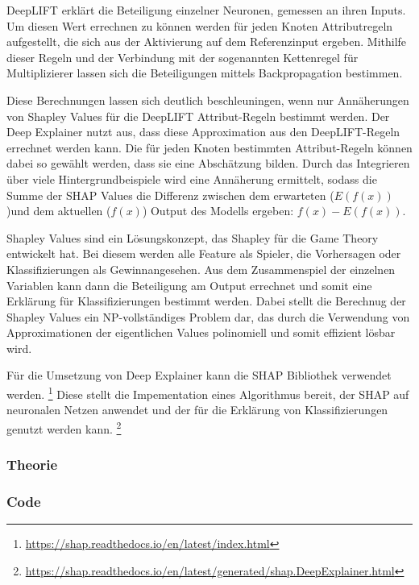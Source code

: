 DeepLIFT erklärt die Beteiligung einzelner Neuronen, gemessen an ihren Inputs. Um diesen Wert errechnen zu können werden für jeden Knoten Attributregeln aufgestellt, die sich aus der Aktivierung auf dem Referenzinput ergeben. Mithilfe dieser Regeln und der Verbindung mit der sogenannten Kettenregel für Multiplizierer \cite{ShrikumarSHAPDeepExplainer} lassen sich die Beteiligungen mittels Backpropagation bestimmen. \cite{ShrikumarSHAPDeepExplainer}


Diese Berechnungen lassen sich deutlich beschleuningen, wenn nur Annäherungen von Shapley Values für die DeepLIFT Attribut-Regeln bestimmt werden. Der Deep Explainer nutzt aus, dass diese Approximation aus den DeepLIFT-Regeln errechnet werden kann. Die für jeden Knoten bestimmten Attribut-Regeln können dabei so gewählt werden, dass sie eine Abschätzung bilden. Durch das Integrieren über viele Hintergrundbeispiele wird eine Annäherung ermittelt, sodass die Summe der SHAP Values die Differenz zwischen dem erwarteten ($E(f(x))$)und dem aktuellen ($f(x)$) Output des Modells ergeben: $f(x)-E(f(x))$. \cite{LundbergSHAPDeepExplainer} 


Shapley Values sind ein Lösungskonzept, das Shapley für die Game Theory entwickelt hat. Bei diesem werden alle Feature als \glqq Spieler\grqq, die Vorhersagen oder Klassifizierungen als \glqq Gewinn\grqq angesehen. Aus dem Zusammenspiel der einzelnen Variablen kann dann die Beteiligung am Output errechnet und somit eine Erklärung für Klassifizierungen bestimmt werden. \cite{ShapleyValMolnar} Dabei stellt die Berechnug der Shapley Values ein NP-vollständiges Problem dar, das durch die Verwendung von Approximationen der eigentlichen Values polinomiell und somit effizient lösbar wird. \cite{CastroShapley}


Für die Umsetzung von Deep Explainer kann die SHAP Bibliothek verwendet werden. \footnote{\url{https://shap.readthedocs.io/en/latest/index.html}} Diese stellt die Impementation eines Algorithmus bereit, der SHAP auf neuronalen Netzen anwendet und der für die Erklärung von Klassifizierungen genutzt werden kann. \footnote{\url{https://shap.readthedocs.io/en/latest/generated/shap.DeepExplainer.html}}

\subsubsection{Theorie}
\label{subsubsection: Feature Contribution Theorie}

\subsubsection{Code}
\label{subsubsection: Feature Contribution Code}

